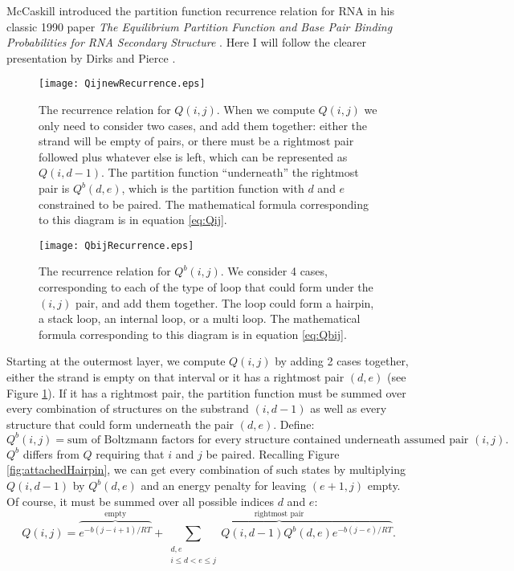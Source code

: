 McCaskill introduced the partition function recurrence relation for
RNA in his classic 1990 paper \emph{The Equilibrium Partition Function
  and Base Pair Binding Probabilities for RNA Secondary Structure}
\cite{mccaskill1990equilibrium}. Here I will follow the clearer
presentation by Dirks and Pierce \cite{dirks2003partition}.

\begin{figure}[t]
\centering
\texttt{[image: QijnewRecurrence.eps]}
\caption{The recurrence relation for $Q(i,j)$. When we compute
  $Q(i,j)$ we only need to consider two cases, and add them together:
  either the strand will be empty of pairs, or there must be a
  rightmost pair followed plus whatever else is left, which can be
  represented as $Q(i, d-1)$. The partition function ``underneath''
  the rightmost pair is $Q^b(d, e)$, which is the partition function
  with $d$ and $e$ constrained to be paired. The mathematical formula
  corresponding to this diagram is in equation \ref{eq:Qij}.}
\label{fig:recurrenceRelationsQij}
\end{figure}
\begin{figure}[t]
\centering
\texttt{[image: QbijRecurrence.eps]}
\caption{The recurrence relation for $Q^b(i,j)$. We consider 4 cases,
  corresponding to each of the type of loop that could form under the
  $(i,j)$ pair, and add them together. The loop could form a hairpin,
  a stack loop, an internal loop, or a multi loop. The mathematical
  formula corresponding to this diagram is in equation \ref{eq:Qbij}.}
\label{fig:recurrenceRelationsQbij}
\end{figure}

Starting at the outermost layer, we compute $Q(i,j)$ by adding 2 cases
together, either the strand is empty on that interval or it has a
rightmost pair $(d,e)$ (see Figure
\ref{fig:recurrenceRelationsQij}). If it has a rightmost pair, the
partition function must be summed over every combination of structures
on the substrand $(i, d-1)$ as well as every structure that could form
underneath the pair $(d,e)$. Define:
\begin{equation}
Q^b(i, j) = \text{sum of Boltzmann factors for every structure
  contained underneath assumed pair } (i,j).
\end{equation}
$Q^b$ differs from $Q$ requiring that $i$ and $j$ be paired.
Recalling Figure \ref{fig:attachedHairpin}, we can get every
combination of such states by multiplying $Q(i, d-1)$ by $Q^b(d,e)$
and an energy penalty for leaving $(e+1, j)$ empty. Of course, it must
be summed over all possible indices $d$ and $e$:
\begin{equation} 
Q(i,j) = \overbrace{e^{-b(j-i+1)/RT}}^{\text{empty}} + \overbrace{\sum_{\substack{ d,e \\ i \leq d < e \leq j}}Q(i, d - 1) Q^b(d, e) e^{-b(j-e)/RT}}^{\text{rightmost pair}}. 
\label{eq:Qij}
\end{equation}

